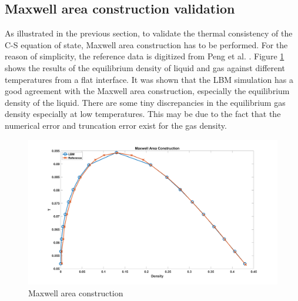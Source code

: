 \documentclass[review]{elsarticle}
\begin{document}
\subsection{Maxwell area construction validation}
As illustrated in the previous section, to validate the thermal consistency of the C-S equation of state, Maxwell area construction has to be performed. For the reason of simplicity, the reference data is digitized from Peng et al. \cite{peng2019simulation}. Figure \ref{fig:maxwell} shows the results of the equilibrium density of liquid and gas against different temperatures from a flat interface. It was shown that the LBM simulation has a good agreement with the Maxwell area construction, especially the equilibrium density of the liquid. There are some tiny discrepancies in the equilibrium gas density especially at low temperatures. This may be due to the fact that the numerical error and truncation error exist for the gas density. 
\begin{figure}[htp]
	\centering
	\includegraphics[width=1\textwidth,height=0.5\textheight]{maxwell}
	\caption{Maxwell area construction}
	\label{fig:maxwell}
\end{figure}
\end{document}
